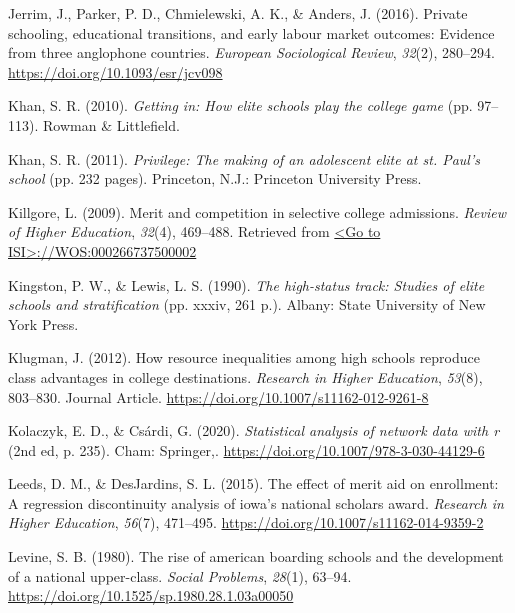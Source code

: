 \documentclass[
  12pt,
]{article}
\newlength{\cslhangindent}
\newlength{\cslentryspacingunit} %
\newenvironment{CSLReferences}[2] %
 {%
  \setlength{\parindent}{0pt}
  \ifodd #1
  \let\oldpar\par
  \def\par{\hangindent=\cslhangindent\oldpar}
  \fi
  \setlength{\parskip}{#2\cslentryspacingunit}
 }%
 {}
\begin{document}
\begin{CSLReferences}{1}{0}
\leavevmode{}%
Jerrim, J., Parker, P. D., Chmielewski, A. K., \& Anders, J. (2016). Private schooling, educational transitions, and early labour market outcomes: Evidence from three anglophone countries. \emph{European Sociological Review}, \emph{32}(2), 280--294. \url{https://doi.org/10.1093/esr/jcv098}

\leavevmode{}%
Khan, S. R. (2010). \emph{Getting in: How elite schools play the college game} (pp. 97--113). Rowman \& Littlefield.

\leavevmode{}%
Khan, S. R. (2011). \emph{Privilege: The making of an adolescent elite at st. Paul's school} (pp. 232 pages). Princeton, N.J.: Princeton University Press.

\leavevmode{}%
Killgore, L. (2009). Merit and competition in selective college admissions. \emph{Review of Higher Education}, \emph{32}(4), 469--488. Retrieved from \href{\%3CGo\%20to\%20ISI\%3E://WOS:000266737500002}{\textless Go to ISI\textgreater://WOS:000266737500002}

\leavevmode{}%
Kingston, P. W., \& Lewis, L. S. (1990). \emph{The high-status track: Studies of elite schools and stratification} (pp. xxxiv, 261 p.). Albany: State University of New York Press.

\leavevmode{}%
Klugman, J. (2012). How resource inequalities among high schools reproduce class advantages in college destinations. \emph{Research in Higher Education}, \emph{53}(8), 803--830. Journal Article. \url{https://doi.org/10.1007/s11162-012-9261-8}

\leavevmode{}%
Kolaczyk, E. D., \& Csárdi, G. (2020). \emph{Statistical analysis of network data with r} (2nd ed, p. 235). Cham: Springer,. \url{https://doi.org/10.1007/978-3-030-44129-6}

\leavevmode{}%
Leeds, D. M., \& DesJardins, S. L. (2015). The effect of merit aid on enrollment: A regression discontinuity analysis of iowa's national scholars award. \emph{Research in Higher Education}, \emph{56}(7), 471--495. \url{https://doi.org/10.1007/s11162-014-9359-2}

\leavevmode{}%
Levine, S. B. (1980). The rise of american boarding schools and the development of a national upper-class. \emph{Social Problems}, \emph{28}(1), 63--94. \url{https://doi.org/10.1525/sp.1980.28.1.03a00050}


\end{CSLReferences}
\end{document}
